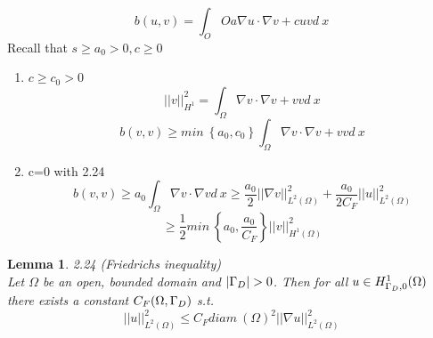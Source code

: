 \documentclass[english]{article}
\newtheorem*{lemma}{Lemma}
\theoremstyle{definition}
\theoremstyle{remark}
\newcommand{\f}[2]{\frac{#1}{#2}}							%
\newcommand{\OO}{\Omega}
\begin{document}
$$b(u,v) = \int_OO a \nabla u \cdot \nabla v + cuv d\ x$$
Recall that $s\geq a_0 >0, c\geq 0$\\
\begin{enumerate}
	\item $c\geq c_0 >0$\\
	$$||v||^2_{H^1} = \int_\OO \nabla v \cdot \nabla v + vv d\ x$$
	$$b(v,v)\geq min\ \left\{a_0,c_0 \right\}\int_\OO \nabla v \cdot\nabla v + vv d\ x$$
	\item c=0 with 2.24 \\
	$$b(v,v)\geq a_0\int_\OO \nabla v \cdot \nabla v d\ x \geq \f{a_0}{2}||\nabla v||^2_{L^2(\OO)} + \f{a_0}{2C_F}||u||^2_{L^2(\OO)}$$
	$$\geq \f{1}{2} min\ \left\{a_0, \f{a_0}{C_F}\right\} ||v||^2 _{H^1(\OO)}$$
\end{enumerate}
\begin{lemma}2.24 (Friedrichs inequality)\\
Let $\OO$ be an open, bounded domain and $|\Gamma_D| >0$. Then for all $u \in H^1_{\GG_D,0}(\OO) $ there exists a constant $C_F(\OO,\GG_D)$ s.t. 
$$||u||^2_{L^2(\OO)} \leq C_F diam\ (\OO)^2 ||\nabla u||^2 _{L^2(\OO)}$$
\end{lemma}

\printindex %
\end{document}
